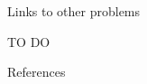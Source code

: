 \documentclass[final]{beamer}
\newlength{\sepwid}
\newlength{\onecolwid}
\begin{document}
\begin{frame}
\begin{columns}[t]
\begin{column}{\onecolwid}
\begin{columns}[t]
\begin{column}{\onecolwid}
\begin{exampleblock}{Links to other problems}

TO DO
\end{exampleblock}

\begin{alertblock}{References}

\begin{thebibliography}{99}
\end{thebibliography}

\end{alertblock}
\end{column} %
\end{columns}
\end{column}
\begin{column}{\sepwid}
\end{column} %
\end{columns} %
\end{frame} %
\end{document}
